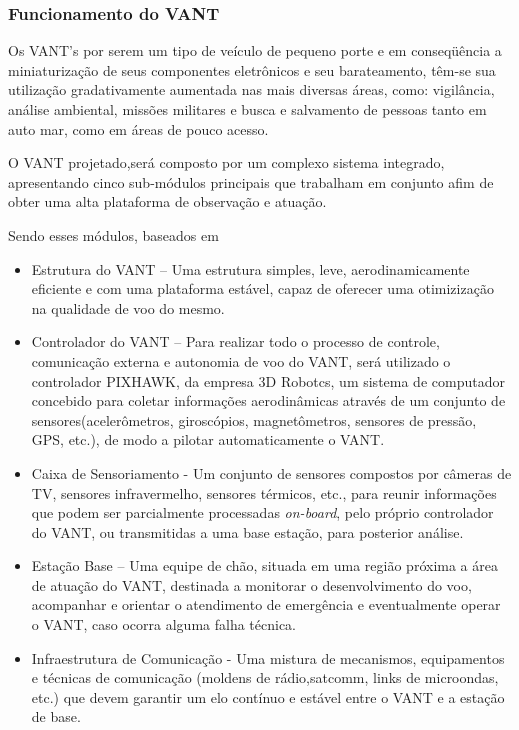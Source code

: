 \subsubsection{Funcionamento do VANT}

Os VANT's por serem um tipo de veículo de pequeno porte e em conseqüência a miniaturização de seus componentes eletrônicos e seu barateamento, têm-se sua utilização gradativamente aumentada nas mais diversas áreas, como: vigilância, análise ambiental, missões militares e busca e salvamento de pessoas tanto em auto mar, como em áreas de pouco acesso. \cite{Branco}

O VANT projetado,será composto por um complexo sistema integrado, apresentando cinco sub-módulos principais  que trabalham em conjunto afim de obter uma alta plataforma de observação e atuação.

Sendo esses módulos, baseados em \cite{pastor}

\begin{itemize}
	\item Estrutura do VANT – Uma estrutura simples, leve, aerodinamicamente eficiente e com uma plataforma estável, capaz de oferecer uma otimizização na qualidade de voo do mesmo. 
	\item Controlador do VANT – Para realizar todo o processo de controle, comunicação externa e autonomia de voo do VANT, será utilizado o controlador PIXHAWK, da empresa 3D Robotcs, um sistema de computador concebido para coletar informações aerodinâmicas através de um conjunto de sensores(acelerômetros, giroscópios, magnetômetros, sensores de pressão, GPS, etc.), de modo a pilotar automaticamente o VANT.
	\item Caixa de Sensoriamento - Um conjunto de sensores compostos por câmeras de TV, sensores infravermelho, sensores térmicos, etc., para reunir informações que podem ser parcialmente processadas \textit{on-board}, pelo próprio controlador do VANT, ou transmitidas a uma base estação, para posterior análise.
	\item Estação Base – Uma equipe de chão, situada em uma região próxima a área de atuação do VANT, destinada a monitorar o desenvolvimento do voo, acompanhar e orientar o atendimento de emergência e eventualmente operar o VANT, caso ocorra alguma falha técnica. 
	\item Infraestrutura de Comunicação - Uma mistura de mecanismos, equipamentos e técnicas de comunicação (moldens de rádio,satcomm, links de microondas, etc.) que devem garantir um elo contínuo e estável entre o VANT e a estação de base. 
\end{itemize}


